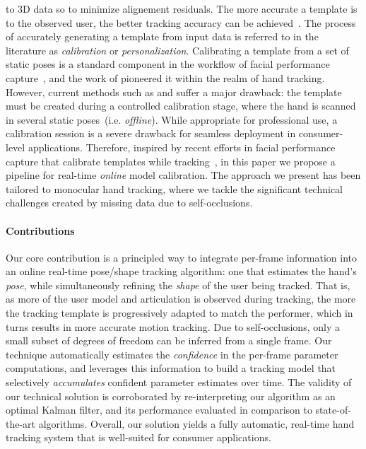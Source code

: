 to 3D data so to minimize alignement residuals. The more accurate a template is to the observed user, the better tracking accuracy can be achieved~\cite{tkach2016sphere,taylor2016joint}. The process of accurately generating a template from input data is referred to in the literature as \emph{calibration} or \emph{personalization}. 
Calibrating a template from a set of static poses is a standard component in the workflow of facial performance capture~\cite{weise2011realtime,thabo}, and the work of  \cite{taylor2014user} pioneered it within the realm of hand tracking. However, current methods such as \cite{taylor2016joint} and \cite{tkach2016sphere} suffer a major drawback: the template must be created during a controlled calibration stage, where the hand is scanned in several static poses~(i.e. \emph{offline}). While appropriate for professional use, a calibration session is a severe drawback for seamless deployment in consumer-level applications.
Therefore, inspired by recent efforts in facial performance capture that calibrate templates while tracking~\cite{li_sig13,bouaziz2013online}, in this paper we propose a pipeline for real-time \emph{online} model calibration. The approach we present has been tailored to monocular hand tracking, where we tackle the significant technical challenges created by missing data due to self-occlusions.

\paragraph{Contributions}
Our core contribution is a principled way to integrate per-frame information into an online real-time pose/shape tracking algorithm: one that estimates the hand's \emph{pose}, while simultaneously refining the \emph{shape} of the user being tracked. That is, as more of the user model and articulation is observed during tracking, the more the tracking template is progressively adapted to match the performer, which in turns results in more accurate motion tracking. Due to self-occlusions, only a small subset of degrees of freedom can be inferred from a single frame. Our technique automatically estimates the \emph{confidence} in the per-frame parameter computations, and leverages this information to build a tracking model that selectively \emph{accumulates} confident parameter estimates over time. The validity of our technical solution is corroborated by re-interpreting our algorithm as an optimal Kalman filter, and its performance evaluated in comparison to state-of-the-art algorithms. Overall, our solution yields a fully automatic, real-time hand tracking system that is well-suited for consumer applications.

